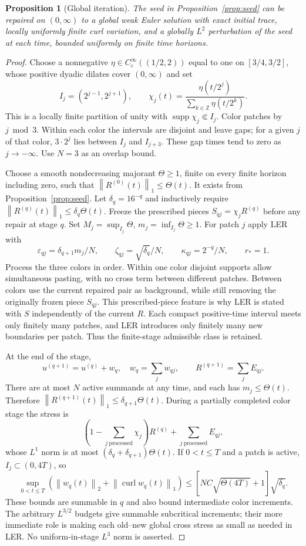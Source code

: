 \documentclass[11pt]{article}
\newtheorem{proposition}[theorem]{Proposition}
\theoremstyle{remark}\newtheorem{remark}[theorem]{Remark}
\newcommand{\curl}{\operatorname{curl}}
\newcommand{\supp}{\operatorname{supp}}
\newcommand{\norm}[2]{\left\|#1\right\|_{#2}}
\begin{document}
\begin{proposition}[Global iteration]\label{prop:iteration}
The seed in Proposition~\ref{prop:seed} can be repaired
on $(0,\infty)$ to a global weak Euler solution with exact initial trace,
locally uniformly finite curl variation, and a globally $L^2$ perturbation
of the seed at each time, bounded uniformly on finite time horizons.
\end{proposition}
\begin{proof}
Choose a nonnegative $\eta\in C_c^\infty((1/2,2))$ equal to one on $[3/4,3/2]$, whose positive dyadic dilates
cover $(0,\infty)$ and set
\[
 I_j=(2^{j-1},2^{j+1}),\qquad
 \chi_j(t)=\frac{\eta(t/2^j)}{\sum_{k\in\mathbb Z}\eta(t/2^k)}.
\]
This is a locally finite partition of unity with
$\supp\chi_j\Subset I_j$. Color patches by $j\bmod3$.
Within each color the intervals are disjoint and leave gaps; for a given
$j$ of that color, $3\cdot2^j$ lies between $I_j$ and $I_{j+3}$.
These gap times tend to zero as $j\to-\infty$. Use $N=3$ as an overlap bound.

Choose a smooth nondecreasing majorant $\Theta\geq1$, finite on every finite
horizon including zero, such that $\norm{R^{(0)}(t)}1\leq\Theta(t)$.
It exists from Proposition~\ref{prop:seed}. Let $\delta_q=16^{-q}$ and
inductively require $\norm{R^{(q)}(t)}1\leq\delta_q\Theta(t)$.
Freeze the prescribed pieces $S_{qj}=\chi_jR^{(q)}$ before any repair at
stage $q$. Set $M_j=\sup_{I_j}\Theta$, $m_j=\inf_{I_j}\Theta\geq1$.
For patch $j$ apply LER with
\[
 \varepsilon_{qj}=\delta_{q+1}m_j/N,\qquad
 \zeta_{qj}=\sqrt{\delta_q}/N,\qquad
 \kappa_{qj}=2^{-q}/N,\qquad r_*=1.
\]
Process the three colors in order. Within one color disjoint supports
allow simultaneous pasting, with no cross term between different patches.
Between colors use the current repaired pair as background, while still
removing the originally frozen piece $S_{qj}$. This prescribed-piece
feature is why LER is stated with $S$ independently of the current $R$.
Each compact positive-time interval meets only finitely many patches,
and LER introduces only finitely many new boundaries per patch.
Thus the finite-stage admissible class is retained.

At the end of the stage,
\[
 u^{(q+1)}=u^{(q)}+w_q,\quad w_q=\sum_jw_{qj},\qquad
 R^{(q+1)}=\sum_jE_{qj}.
\]
There are at most $N$ active summands at any time, and each has
$m_j\leq\Theta(t)$. Therefore
$\norm{R^{(q+1)}(t)}1\leq\delta_{q+1}\Theta(t)$.
During a partially completed color stage the stress is
\[
 \left(1-\sum_{j\ \mathrm{processed}}\chi_j\right)R^{(q)}
 +\sum_{j\ \mathrm{processed}}E_{qj},
\]
whose $L^1$ norm is at most $(\delta_q+\delta_{q+1})\Theta(t)$.
If $0<t\leq T$ and a patch is active, $I_j\subset(0,4T)$, so
\begin{equation}\label{eq:increment-stage}
 \sup_{0<t\leq T}\left(\norm{w_q(t)}2+
 \norm{\curl w_q(t)}1\right)
 \leq[NC\sqrt{\Theta(4T)}+1]\sqrt{\delta_q}.
\end{equation}
These bounds are summable in $q$ and also bound intermediate color increments.
The arbitrary $L^{3/2}$ budgets give summable subcritical increments; their
more immediate role is making each old--new global cross stress as small
as needed in LER. No uniform-in-stage $L^3$ norm is asserted.


\end{proof}
\end{document}

